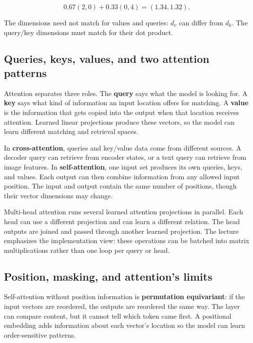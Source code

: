 \[
0.67(2,0)+0.33(0,4)=(1.34,1.32).
\]

The dimensions need not match for values and queries: \(d_v\) can differ from \(d_k\). The query/key dimensions must match for their dot product.

\subsection{Queries, keys, values, and two attention patterns}\label{04-visual-computing-ii-ch031-queries-keys-values-and-two-attention-patterns}

\hypertarget{04-visual-computing-ii-ch031-queries-keys-values-and-two-attention-patterns}{}

Attention separates three roles. The \textbf{query} says what the model is looking for. A \textbf{key} says what kind of information an input location offers for matching. A \textbf{value} is the information that gets copied into the output when that location receives attention. Learned linear projections produce these vectors, so the model can learn different matching and retrieval spaces.

In \textbf{cross-attention}, queries and key/value data come from different sources. A decoder query can retrieve from encoder states, or a text query can retrieve from image features. In \textbf{self-attention}, one input set produces its own queries, keys, and values. Each output can then combine information from any allowed input position. The input and output contain the same number of positions, though their vector dimensions may change.

Multi-head attention runs several learned attention projections in parallel. Each head can use a different projection and can learn a different relation. The head outputs are joined and passed through another learned projection. The lecture emphasizes the implementation view: these operations can be batched into matrix multiplications rather than one loop per query or head.

\subsection{Position, masking, and attention's limits}\label{04-visual-computing-ii-ch031-position-masking-and-attentions-limits}

\hypertarget{04-visual-computing-ii-ch031-position-masking-and-attentions-limits}{}

Self-attention without position information is \textbf{permutation equivariant}: if the input vectors are reordered, the outputs are reordered the same way. The layer can compare content, but it cannot tell which token came first. A positional embedding adds information about each vector's location so the model can learn order-sensitive patterns.

